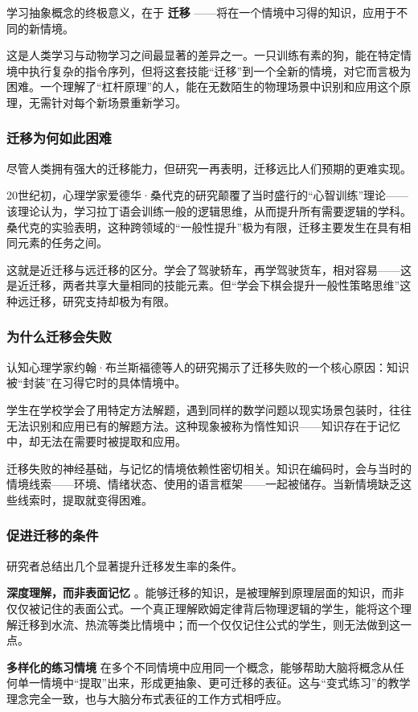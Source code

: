 \documentclass[11pt]{article}
\begin{document}
学习抽象概念的终极意义，在于 \textbf{迁移} ——将在一个情境中习得的知识，应用于不同的新情境。

这是人类学习与动物学习之间最显著的差异之一。一只训练有素的狗，能在特定情境中执行复杂的指令序列，但将这套技能“迁移”到一个全新的情境，对它而言极为困难。一个理解了“杠杆原理”的人，能在无数陌生的物理场景中识别和应用这个原理，无需针对每个新场景重新学习。
\subsubsection{迁移为何如此困难}
\label{sec:orgafb087b}

尽管人类拥有强大的迁移能力，但研究一再表明，迁移远比人们预期的更难实现。

20世纪初，心理学家爱德华·桑代克的研究颠覆了当时盛行的“心智训练”理论——该理论认为，学习拉丁语会训练一般的逻辑思维，从而提升所有需要逻辑的学科。桑代克的实验表明，这种跨领域的“一般性提升”极为有限，迁移主要发生在具有相同元素的任务之间。

这就是近迁移与远迁移的区分。学会了驾驶轿车，再学驾驶货车，相对容易——这是近迁移，两者共享大量相同的技能元素。但“学会下棋会提升一般性策略思维”这种远迁移，研究支持却极为有限。
\subsubsection{为什么迁移会失败}
\label{sec:org00ee8b3}

认知心理学家约翰·布兰斯福德等人的研究揭示了迁移失败的一个核心原因：知识被“封装”在习得它时的具体情境中。

学生在学校学会了用特定方法解题，遇到同样的数学问题以现实场景包装时，往往无法识别和应用已有的解题方法。这种现象被称为惰性知识——知识存在于记忆中，却无法在需要时被提取和应用。

迁移失败的神经基础，与记忆的情境依赖性密切相关。知识在编码时，会与当时的情境线索——环境、情绪状态、使用的语言框架——一起被储存。当新情境缺乏这些线索时，提取就变得困难。
\subsubsection{促进迁移的条件}
\label{sec:orge8f4e3b}

研究者总结出几个显著提升迁移发生率的条件。

\textbf{深度理解，而非表面记忆} 。能够迁移的知识，是被理解到原理层面的知识，而非仅仅被记住的表面公式。一个真正理解欧姆定律背后物理逻辑的学生，能将这个理解迁移到水流、热流等类比情境中；而一个仅仅记住公式的学生，则无法做到这一点。

\textbf{多样化的练习情境} 在多个不同情境中应用同一个概念，能够帮助大脑将概念从任何单一情境中“提取”出来，形成更抽象、更可迁移的表征。这与“变式练习”的教学理念完全一致，也与大脑分布式表征的工作方式相呼应。
\end{document}

